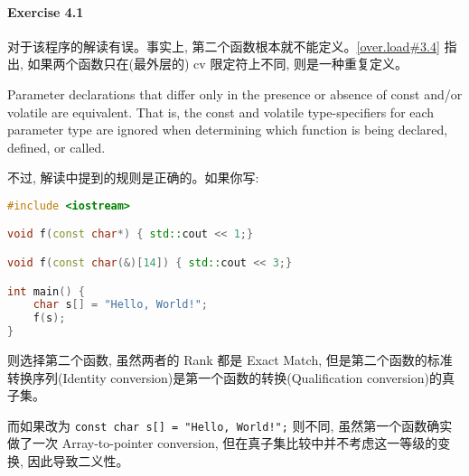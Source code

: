 \documentclass{article}
\begin{document}
	\paragraph*{Exercise 4.1} 
	
	对于该程序的解读有误。事实上, 第二个函数根本就不能定义。\href{https://timsong-cpp.github.io/cppwp/n4659/over.load#3.4}{[over.load\#3.4]} 指出, 如果两个函数只在(最外层的) cv 限定符上不同, 则是一种重复定义。
	
	\begin{lightgrayleftbar}
		Parameter declarations that differ only in the presence or absence of const and/or volatile are equivalent. That is, the const and volatile type-specifiers for each parameter type are ignored when determining which function is being declared, defined, or called.
	\end{lightgrayleftbar}
	
	不过, 解读中提到的规则是正确的。如果你写:
	
	\begin{lstlisting}[language=C++]
#include <iostream>

void f(const char*) { std::cout << 1;}

void f(const char(&)[14]) { std::cout << 3;}

int main() {
	char s[] = "Hello, World!";
	f(s);
}
	\end{lstlisting}
	则选择第二个函数, 虽然两者的 Rank 都是 Exact Match, 但是第二个函数的标准转换序列(Identity conversion)是第一个函数的转换(Qualification conversion)的真子集。
	
	而如果改为 \verb|const char s[] = "Hello, World!";| 则不同, 虽然第一个函数确实做了一次 Array-to-pointer conversion, 但在真子集比较中并不考虑这一等级的变换, 因此导致二义性。
\end{document}
